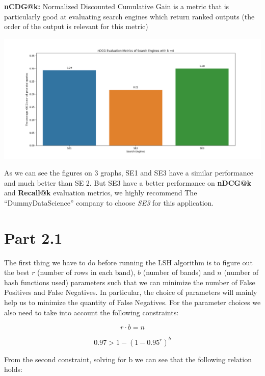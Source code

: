 \documentclass[10pt]{article}
\begin{document}
\textbf{nCDG@k:} Normalized Discounted Cumulative Gain is a metric that is particularly good at evaluating search engines which return ranked outputs (the order of the output is relevant for this metric)

\begin{center}
\includegraphics[scale=.25]{nDCG.png}
\end{center}

As we can see the figures on 3 graphs, SE1 and SE3 have a similar performance and much better than SE 2. But SE3 have a better performance on \textbf{nDCG@k} and \textbf{Recall@k} evaluation metrics, we highly recommend The “DummyDataScience” company to choose \textit{SE3} for this application.

\section{Part 2.1}

The first thing we have to do before running the LSH algorithm is to figure out the best $r$ (number of rows in each band), $b$ (number of bands) and $n$ (number of hash functions used) parameters such that we can minimize the number of False Positives and False Negatives. In particular, the choice of parameters will mainly help us to minimize the quantity of False Negatives. For the parameter choices we also need to take into account the following constraints:

\begin{equation}
r \cdot b = n
\end{equation}


\begin{equation}
0.97 > 1 - (1-0.95^r)^b
\end{equation}

From the second constraint, solving for b we can see that the following relation holds:
\end{document}
